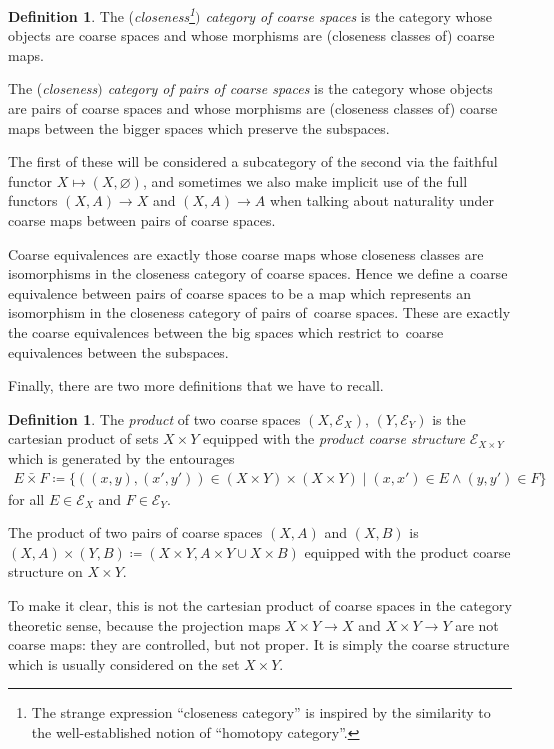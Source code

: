 \documentclass[pdftex]{sigma}
\numberwithin{equation}{section}
\theoremstyle{definition}
\newtheorem{defn}[thm]{Definition}
\newcommand{\coarseStr}{\mathcal{E}}
\newcommand{\swapcross}{\mathbin{\bar\times}}
\begin{document}
\begin{defn}\label{def:coarsecategories}
The (\emph{closeness\footnote{The strange expression ``closeness category'' is inspired by the similarity to the well-established notion of ``homotopy category''.}$)$ category of coarse spaces} is the category whose objects are coarse spaces and whose morphisms are (closeness classes of) coarse maps.

The (\emph{closeness$)$ category of pairs of coarse spaces} is the category whose objects are pairs of coarse spaces and whose morphisms are (closeness classes of) coarse maps between the bigger spaces which preserve the subspaces.
\end{defn}

The first of these will be considered a subcategory of the second via the faithful functor $X\mapsto(X,\varnothing)$, and sometimes we also make implicit use of the full functors $(X,A)\to X$ and $(X,A)\to A$ when talking about naturality under coarse maps between pairs of coarse spaces.

Coarse equivalences are exactly those coarse maps whose closeness classes are isomorphisms in the closeness category of coarse spaces. Hence we define a coarse equivalence between pairs of coarse spaces to be a map which represents an isomorphism in the closeness category of pairs of~coarse spaces. These are exactly the coarse equivalences between the big spaces which restrict to~coarse equivalences between the subspaces.



Finally, there are two more definitions that we have to recall.

\begin{defn}
{\samepage The \emph{product} of two coarse spaces $(X,\coarseStr_X)$, $(Y,\coarseStr_Y)$ is the cartesian product of sets $X\times Y$ equipped with the \emph{product coarse structure} $\coarseStr_{X\times Y}$ which is generated by the entourages
\begin{gather*}
E\swapcross F\coloneqq\{((x,y),(x',y'))\in (X\times Y)\times(X\times Y)\mid (x,x')\in E\wedge (y,y')\in F\}
\end{gather*}
for all $E\in \coarseStr_X$ and $F\in\coarseStr_Y$.}

The product of two pairs of coarse spaces $(X,A)$ and $(X,B)$ is $(X,A)\times (Y,B)\coloneqq (X\times Y,A\times Y\cup X\times B)$ equipped with the product coarse structure on $X\times Y$.
\end{defn}

To make it clear, this is not the cartesian product of coarse spaces in the category theoretic sense,
because the projection maps $X\times Y\to X$ and $X\times Y\to Y$ are not coarse maps: they are controlled, but not proper.
It is simply the coarse structure which is usually considered on the set $X\times Y$.
\end{document}
